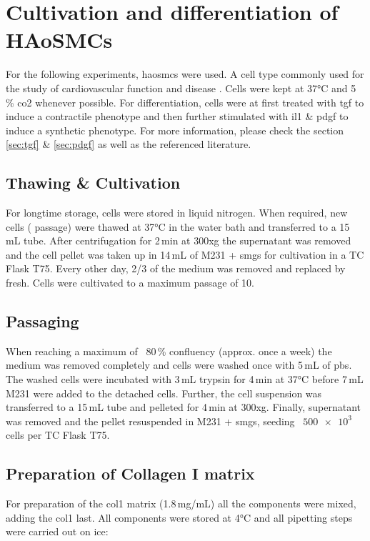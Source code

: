 \section{Cultivation and differentiation of HAoSMCs}
\label{sec:cultivation}
For the following experiments, \acfp{haosmc} were used. A cell type commonly used for the study of cardiovascular function and disease \cite{[Reference for this claim]}. Cells were kept at 37°C and 5\,\% \ac{co2} whenever possible. For differentiation, cells were at first treated with \ac{tgf} to induce a contractile phenotype and then further stimulated with \acf{il1} \& \ac{pdgf} to induce a synthetic phenotype. For more information, please check the section \ref{sec:tgf} \&  \ref{sec:pdgf} as well as the referenced literature.

    \subsection{Thawing \& Cultivation}
    For longtime storage, cells were stored in liquid nitrogen. When required, new cells ( passage) were thawed at 37°C in the water bath and transferred to a 15\,mL tube. After centrifugation for 2\,min at 300xg the supernatant was removed and the cell pellet was taken up in 14\,mL of \ac{M231} + \ac{smgs} for cultivation in a TC Flask T75. Every other day, 2/3 of the medium was removed and replaced by fresh. Cells were cultivated to a maximum passage of 10.

    \subsection{Passaging}
    When reaching a maximum of ~80\,\% confluency (approx. once a week) the medium was removed completely and cells were washed once with 5\,mL of \ac{pbs}. The washed cells were incubated with 3\,mL trypsin for 4\,min at 37°C before 7\,mL \ac{M231} were added to the detached cells. Further, the cell suspension was transferred to a 15\,mL tube and pelleted for 4\,min at 300xg. Finally, supernatant was removed and the pellet resuspended in \ac{M231} + \ac{smgs}, seeding ~$\num{500e3}$ cells per TC Flask T75.

    \subsection{Preparation of Collagen I matrix}
    \label{subsec:matrix}
    For preparation of the \ac{col1} matrix (1.8\,mg/mL) all the components were mixed, adding the \ac{col1} last. All components were stored at 4°C and all pipetting steps were carried out on ice:

